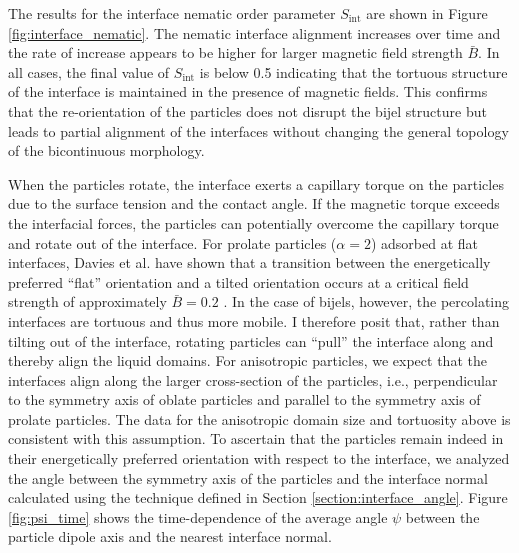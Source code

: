 The results for the interface nematic order parameter $S_{\text{int}}$
are shown in Figure \ref{fig:interface_nematic}. The nematic interface
alignment increases over time and the rate of increase appears to be
higher for larger magnetic field strength $\bar{B}$. In all cases, the
final value of $S_{\text{int}}$ is below 0.5 indicating that the
tortuous structure of the interface is maintained in the presence of
magnetic fields. This confirms that the re-orientation of the particles
does not disrupt the bijel structure but leads to partial alignment of
the interfaces without changing the general topology of the bicontinuous
morphology.

When the particles rotate, the interface exerts a capillary torque on
the particles due to the surface tension and the contact angle. If the
magnetic torque exceeds the interfacial forces, the particles can
potentially overcome the capillary torque and rotate out of the
interface. For prolate particles (\(\alpha=2\)) adsorbed at flat
interfaces, Davies et al. have shown that a transition between the
energetically preferred ``flat'' orientation and a tilted orientation
occurs at a critical field strength of approximately \(\bar{B}=0.2\)
\cite{bresme_orientational_2007,davies_interface_2014,newton_influence_2014}.
In the case of bijels, however, the percolating interfaces are tortuous
and thus more mobile. I therefore posit that, rather than tilting out
of the interface, rotating particles can ``pull'' the interface along
and thereby align the liquid domains. For anisotropic particles, we
expect that the interfaces align along the larger cross-section of the
particles, i.e., perpendicular to the symmetry axis of oblate particles
and parallel to the symmetry axis of prolate particles. The data for the
anisotropic domain size and tortuosity above is consistent with this
assumption. To ascertain that the particles remain indeed in their
energetically preferred orientation with respect to the interface, we
analyzed the angle between the symmetry axis of the particles and the
interface normal calculated using the technique defined in Section 
\ref{section:interface_angle}. Figure \ref{fig:psi_time} shows the time-dependence of the average angle
\(\psi\) between the particle dipole axis and the nearest interface normal.

